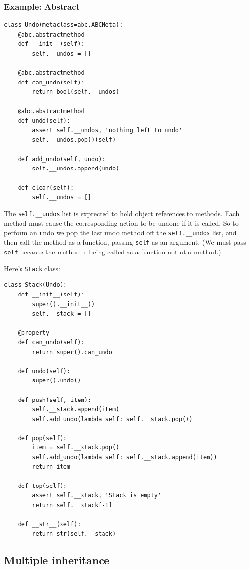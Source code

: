 \subsubsection{Example: Abstract}

\begin{lstlisting}
class Undo(metaclass=abc.ABCMeta):
    @abc.abstractmethod
    def __init__(self):
        self.__undos = []

    @abc.abstractmethod
    def can_undo(self):
        return bool(self.__undos)

    @abc.abstractmethod
    def undo(self):
        assert self.__undos, 'nothing left to undo'
        self.__undos.pop()(self)

    def add_undo(self, undo):
        self.__undos.append(undo)

    def clear(self):
        self.__undos = []  
\end{lstlisting}

The \verb|self.__undos| list is exprected to hold object references to methods.
Each method must cause the corresponding action to be undone if it is called.
So to perform an undo we pop the last undo method off the \verb|self.__undos| list, and then call the method as a function, passing \verb|self| as an argument.
(We must pass \verb|self| because the method is being called as a function not at a method.)


Here's \verb|Stack| class:
\begin{lstlisting}
class Stack(Undo):
    def __init__(self):
        super().__init__()
        self.__stack = []

    @property
    def can_undo(self):
        return super().can_undo

    def undo(self):
        super().undo()

    def push(self, item):
        self.__stack.append(item)
        self.add_undo(lambda self: self.__stack.pop())

    def pop(self):
        item = self.__stack.pop()
        self.add_undo(lambda self: self.__stack.append(item))
        return item

    def top(self):
        assert self.__stack, 'Stack is empty'
        return self.__stack[-1]

    def __str__(self):
        return str(self.__stack)
\end{lstlisting}


\subsection{Multiple inheritance}

